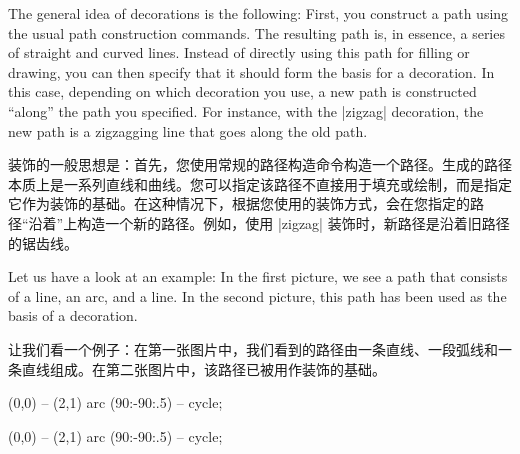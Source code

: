 \begin{codeexample}[preamble={\usetikzlibrary{decorations.pathmorphing}}]
\end{codeexample}

\begin{codeexample}[pre={\pgfmathsetseed{1}},preamble={\usetikzlibrary{decorations.pathmorphing}}]
\end{codeexample}

The general idea of decorations is the following: First, you construct a path
using the usual path construction commands. The resulting path is, in essence,
a series of straight and curved lines. Instead of directly using this path for
filling or drawing, you can then specify that it should form the basis for a
decoration. In this case, depending on which decoration you use, a new path is
constructed ``along'' the path you specified. For instance, with the |zigzag|
decoration, the new path is a zigzagging line that goes along the old path.

装饰的一般思想是：首先，您使用常规的路径构造命令构造一个路径。生成的路径本质上是一系列直线和曲线。您可以指定该路径不直接用于填充或绘制，而是指定它作为装饰的基础。在这种情况下，根据您使用的装饰方式，会在您指定的路径“沿着”上构造一个新的路径。例如，使用 |zigzag| 装饰时，新路径是沿着旧路径的锯齿线。

Let us have a look at an example: In the first picture, we see a path that
consists of a line, an arc, and a line. In the second picture, this path has
been used as the basis of a decoration.

让我们看一个例子：在第一张图片中，我们看到的路径由一条直线、一段弧线和一条直线组成。在第二张图片中，该路径已被用作装饰的基础。

%
\begin{codeexample}[preamble={\usetikzlibrary{decorations.pathmorphing}}]
\tikz \fill
  [fill=blue!20,draw=blue,thick] (0,0) -- (2,1) arc (90:-90:.5) -- cycle;
\end{codeexample}
%
\begin{codeexample}[preamble={\usetikzlibrary{decorations.pathmorphing}}]
\tikz \fill [decorate,decoration={zigzag}]
  [fill=blue!20,draw=blue,thick] (0,0) -- (2,1) arc (90:-90:.5) -- cycle;
\end{codeexample}

